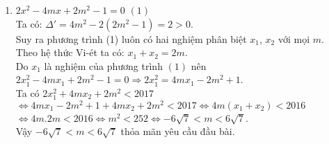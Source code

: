 \begin{ex}
{\begin{enumerate}[1)]
\begin{enumerate}[a)]
Điều kiện của $A$ có nghĩa là $a>0; b>0; a\ne b$.\\
Vậy $A=\dfrac{-2b(\sqrt{a}+1)}{a-b}: \dfrac{2\sqrt{ab}(\sqrt{a}+1)}{a-b}=\dfrac{-\sqrt{b}}{\sqrt{a}}$ với $a>0, b>0, a\ne b$.
		\item 
Ta có $\sqrt{ab}+1=4\sqrt{b}\Leftrightarrow \sqrt{a}+\dfrac{1}{\sqrt{b}}=4$.\\
Theo bất đẳng thức Cô si ta có\\
 $4=\sqrt{a}+\dfrac{1}{\sqrt{b}}\ge 2\sqrt{\sqrt{\dfrac{a}{b}}}\Rightarrow \sqrt{\dfrac{a}{b}}\le 4\Rightarrow \sqrt{\dfrac{b}{a}}\ge \dfrac{1}{4}$.\\
Vậy $A=\dfrac{-\sqrt{b}}{\sqrt{a}}\le \dfrac{-1}{4}$. Dấu bằng xảy ra khi $a=4; b=\dfrac{1}{4}$.\\	
Vậy giá trị lớn nhất của $A=\dfrac{-1}{4}$ khi $a=4; b=\dfrac{1}{4}$.
		\end{enumerate}
\item 
$2x^2-4mx+2m^2-1=0$  $(1)$\\
Ta có: $\Delta '=4m^2-2(2m^2-1)=2>0$.\\
Suy ra phương trình (1) luôn có hai nghiệm phân biệt $x_1$, $x_2$ với mọi $m$. \\
Theo hệ thức Vi-ét ta có: $x_1+x_2=2m$.\\
Do $x_1$ là nghiệm của phương trình $(1)$ nên $2x_1^2-4m x_1+2m^2-1=0 \Rightarrow 2x_1^2=4mx_1-2m^2+1$.\\
Ta có $2x_1^2+4mx_2+2m^2<2017$ $\Leftrightarrow 4mx_1-2m^2+1+4mx_2+2m^2<2017 \Leftrightarrow 4m(x_1+x_2)<2016$\\
$\Leftrightarrow 4m.2m<2016 \Leftrightarrow m^2<252 \Leftrightarrow  -6\sqrt{7}<m<6\sqrt{7}$.\\
Vậy $-6\sqrt{7}<m<6\sqrt{7}$ thỏa mãn yêu cầu đầu bài. 
\end{enumerate}
}
\end{ex}

